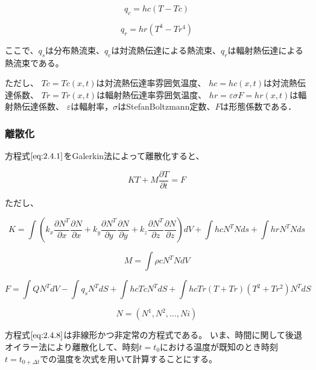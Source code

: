\documentclass[a4paper,pandoc,ja=standard]{bxjsarticle}
\begin{document}
\begin{equation}
q_c=hc(T-Tc)
\label{eq:2.4.6}
\end{equation}

\begin{equation}
q_r=hr(T^4-Tr^4)
\label{eq:2.4.7}
\end{equation}

ここで、\(q_s\)は分布熱流束、\(q_c\)は対流熱伝達による熱流束、\(q_r\)は輻射熱伝達による熱流束である。

ただし、
\(Tc=Tc(x,t)\)は対流熱伝達率雰囲気温度、
\(hc=hc(x,t)\)は対流熱伝達係数、
\(Tr=Tr(x,t)\)は輻射熱伝達率雰囲気温度、
\(hr=\varepsilon \sigma F = {hr(x,t)}\)は輻射熱伝達係数、
\(\varepsilon\)は輻射率，\(\sigma\)はStefanBoltzmann定数、\(F\)は形態係数である．

\hypertarget{ux96e2ux6563ux5316}{%
\subsubsection{離散化}\label{ux96e2ux6563ux5316}}

方程式\(\eqref{eq:2.4.1}\)をGalerkin法によって離散化すると、

\begin{equation}
K T + M \frac{\partial T}{\partial t} = F
\label{eq:2.4.8}
\end{equation}

ただし、

\begin{equation}
K = \int\left( k_x \frac{\partial N^T}{\partial x}\frac{\partial N}{\partial x}
+ k_y \frac{\partial N^T}{\partial y}\frac{\partial N}{\partial y}
+ k_z \frac{\partial N^T}{\partial z}\frac{\partial N}{\partial z} \right) dV
+ \int hc N^T N ds + \int hr N^T N ds
\label{eq:2.4.9}
\end{equation}

\begin{equation}
M = \int \rho c N^T N dV
\label{eq:2.4.10}
\end{equation}

\begin{equation}
F = \int Q N^T dV - \int q_s N^T dS
+ \int{hc} T c N^T dS
+ \int{hcTr} ({T+Tr}) ({T^2 + T r^2}) N^T dS
\label{eq:2.4.11}
\end{equation}

\begin{equation}
N = (N^1, N^2, \ldots, Ni)
\label{eq:2.4.12}
\end{equation}

方程式\(\eqref{eq:2.4.8}\)は非線形かつ非定常の方程式である。
いま、時間に関して後退オイラー法により離散化して、時刻\(t=t_0\)における温度が既知のとき時刻\(t=t_{0+\Delta t}\)での温度を次式を用いて計算することにする。
\end{document}
